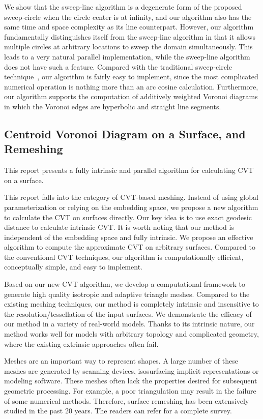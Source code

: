 We show that the sweep-line algorithm is a degenerate form of the
proposed sweep-circle when the circle center is at infinity, and our
algorithm also has the same time and space complexity as its line
counterpart. However, our algorithm fundamentally distinguishes
itself from the sweep-line algorithm in that it allows multiple
circles at arbitrary locations to sweep the domain simultaneously.
This leads to a very natural parallel implementation,
while the sweep-line algorithm does not have such a feature. Compared with the traditional sweep-circle technique~\cite{Dehne_Klein:1987},
our algorithm is fairly easy to implement, since the most complicated numerical operation is nothing more than an arc cosine calculation.
Furthermore, our algorithm supports the computation of additively
weighted Voronoi diagrams in which the Voronoi edges are hyperbolic and
straight line segments.


\subsection{Centroid Voronoi Diagram on a Surface, and Remeshing}

This report presents a fully intrinsic and parallel algorithm for
calculating CVT on a surface.

This report falls into the category of CVT-based meshing. Instead of
using global parameterization or relying on the embedding space,
we propose a new algorithm to calculate the CVT on surfaces
directly. Our key idea is to use exact geodesic distance to calculate intrinsic CVT.
It is worth noting that our method is independent of the embedding space and fully intrinsic.
We propose an effective algorithm to compute the approximate CVT on arbitrary surfaces. Compared to the conventional CVT techniques, our algorithm is computationally efficient, conceptually simple, and easy to
implement.

Based on our new CVT algorithm, we develop a computational
framework to generate high quality isotropic and adaptive triangle
meshes. Compared to the existing meshing techniques, our method is
completely intrinsic and insensitive to the resolution/tessellation
of the input surfaces. We demonstrate the efficacy of our method in
a variety of real-world models. Thanks to its intrinsic nature,
our method works well for models with arbitrary topology and
complicated geometry, where the existing extrinsic approaches often
fail.

Meshes are an important way to represent shapes. A large number
of these meshes are generated by scanning devices, isosurfacing implicit representations or modeling software. These meshes often lack
the properties desired for subsequent geometric processing. For example,
a poor triangulation may result in the failure of some numerical
methods. Therefore, surface remeshing has been extensively studied
in the past 20 years. The readers can refer
\cite{Heckbert_Garland:2004,Talton:2004,alliez-remeshing-survey:2008}
for a complete survey.

